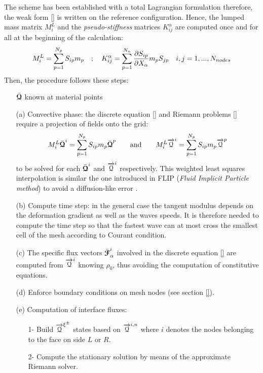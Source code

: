 The scheme has been established with a total Lagrangian formulation therefore, the weak form \eqref{} is written on the reference configuration. Hence, the lumped mass matrix $M^L_i$ and the \textit{pseudo-stiffness} matrices $K^\alpha_{ij}$ are computed once and for all at the beginning of the calculation:
\begin{equation}
M^L_i = \sum^{N_p}_{p=1} S_{ip} m_p  \quad ; \quad  K^\alpha_{ij} = \sum^{N_n}_{p=1} \frac{\partial S_{ip}}{\partial X_\alpha} m_p S_{jp} \quad i,j = 1,...,N_{nodes}
\end{equation}
Then, the procedure follows these steps:
\begin{itemize}
\item[] $\bar{{\boldsymbol{\mathcal{Q}}}}$ known at material points
\item[(a)] Convective phase: the discrete equation \eqref{} and Riemann problems \eqref{} require a projection of fields onto the grid:
  \begin{equation}
    \label{eq:DGMPM_points2nodes}
    M^L_i \bar{{\boldsymbol{\mathcal{Q}}}}^i = \sum_{p=1}^{N_p} S_{ip} m_p \bar{{\boldsymbol{\mathcal{Q}}}}^p \qquad \text{and} \qquad M^L_i {\overrightarrow{\mathcal{Q}}}^i = \sum_{p=1}^{N_p} S_{ip} m_p {\overrightarrow{\mathcal{Q}}}^p 
  \end{equation}
  to be solved for each $\bar{{\boldsymbol{\mathcal{Q}}}}^i$ and ${\overrightarrow{\mathcal{Q}}}^i$ respectively.
  This weighted least squares interpolation is similar the one introduced in FLIP (\textit{Fluid Implicit Particle method}) to avoid a diffusion-like error \cite{Sulsky94,Mass_Flip,FLIP}. %
\item[(b)] Compute time step: in the general case the tangent modulus depends on the deformation gradient as well as the waves speeds. It is therefore needed to compute the time step so that the fastest wave can at most cross the smallest cell of the mesh according to Courant condition.
\item[(c)] The specific flux vectors $\bar{{\boldsymbol{\mathcal{F}}}}^i_{\alpha}$ involved in the discrete equation \eqref{} are computed from ${\overrightarrow{\mathcal{Q}}}^i$ knowing $\rho_0$, thus avoiding the computation of constitutive equations.
\item[(d)] Enforce boundary conditions on mesh nodes (see section \ref{}).
\item[(e)] Computation of interface fluxes: 
  \begin{itemize}
  \item[1-] Build ${\overrightarrow{\mathcal{Q}}}^{\xi^\pm}$ states based on ${\overrightarrow{\mathcal{Q}}}^{i,n}$ where $i$ denotes the nodes belonging to the face on side $L$ or $R$.
  \item[2-] Compute the stationary solution by means of the approximate Riemann solver.

\end{itemize}
\end{itemize}
